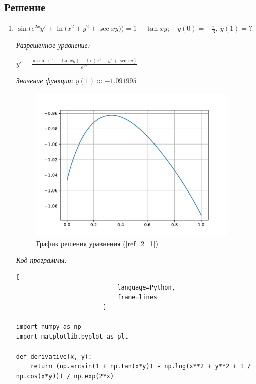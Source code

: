 \documentclass[14pt, titlepage, a4paper, fleqn]{extarticle}
\begin{document}
        \subsection{Решение}
            \begin{enumerate}
                \item \(\displaystyle
                        \sin\Big( e^{2x}y' + \ln\big(x^2 + y^2 + \sec{xy}\big) \Big)
                        = 1 + \tan{xy}; \quad y(0) = -\frac{\pi}{3}, ~ y(1) = ?
                    \) \label{ref_2_1}

                    \textit{Разрешённое уравнение:}

                        \(\displaystyle y' = \frac{\arcsin(1 + \tan{xy}) - 
                        \ln(x^2 + y^2 + \sec{xy})}{e^{2x}}\)

                    \textit{Значение функции:} \(y(1) \approx -1.091995\)

                    \begin{figure}[H]
                        \centering
                        \includegraphics[width=10cm]{Figure_1.pdf}
                        \caption{График решения уравнения (\ref{ref_2_1})}
                    \end{figure}

                    \textit{Код программы:}
                        \begin{lstlisting}[
                            language=Python,                        
                            frame=lines
                        ]

import numpy as np
import matplotlib.pyplot as plt

def derivative(x, y):
    return (np.arcsin(1 + np.tan(x*y)) - np.log(x**2 + y**2 + 1 / np.cos(x*y))) / np.exp(2*x)


\end{lstlisting}
\end{enumerate}
\end{document}
